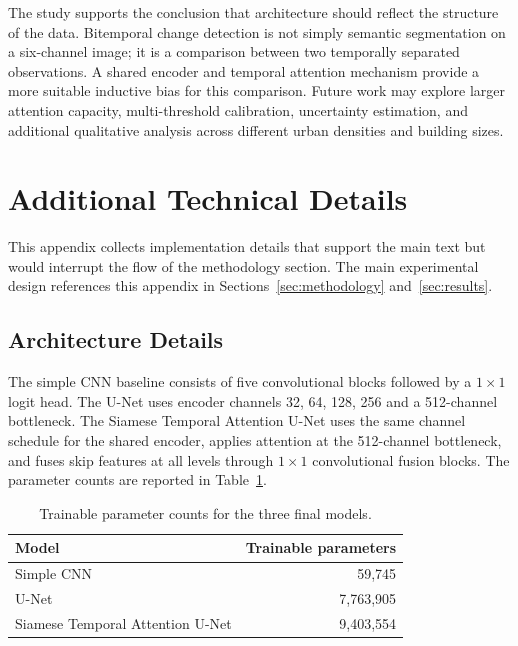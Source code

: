 \documentclass[11pt,a4paper]{article}
\begin{document}
The study supports the conclusion that architecture should reflect the structure of the data. Bitemporal change detection is not simply semantic segmentation on a six-channel image; it is a comparison between two temporally separated observations. A shared encoder and temporal attention mechanism provide a more suitable inductive bias for this comparison. Future work may explore larger attention capacity, multi-threshold calibration, uncertainty estimation, and additional qualitative analysis across different urban densities and building sizes.

\appendix

\section{Additional Technical Details}
\label{app:technical}

This appendix collects implementation details that support the main text but would interrupt the flow of the methodology section. The main experimental design references this appendix in Sections~\ref{sec:methodology} and~\ref{sec:results}.

\subsection{Architecture Details}
\label{app:architecture_details}

The simple CNN baseline consists of five convolutional blocks followed by a $1 \times 1$ logit head. The U-Net uses encoder channels 32, 64, 128, 256 and a 512-channel bottleneck. The Siamese Temporal Attention U-Net uses the same channel schedule for the shared encoder, applies attention at the 512-channel bottleneck, and fuses skip features at all levels through $1 \times 1$ convolutional fusion blocks. The parameter counts are reported in Table~\ref{tab:param_counts}.

\begin{table}[H]
  \centering
  \caption{Trainable parameter counts for the three final models.}
  \label{tab:param_counts}
  \begin{tabular}{lr}
    \toprule
    Model & Trainable parameters \\
    \midrule
    Simple CNN & 59,745 \\
    U-Net & 7,763,905 \\
    Siamese Temporal Attention U-Net & 9,403,554 \\
    \bottomrule
  \end{tabular}
\end{table}
\end{document}
